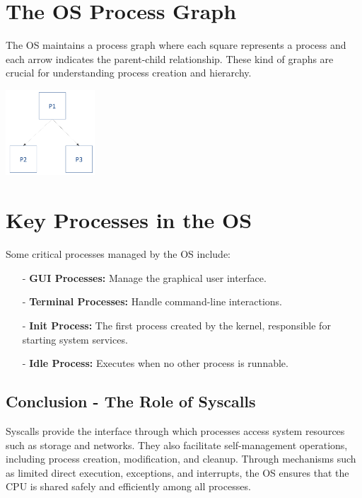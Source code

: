 \section{The OS Process Graph}
The OS maintains a process graph where each square represents a process and each arrow indicates the parent-child relationship. These kind of graphs are crucial for understanding process creation and hierarchy.

\begin{center}
  \includegraphics[width=0.25\textwidth]{chapters/L3/images/graph.png}
\end{center}

\section{Key Processes in the OS}

Some critical processes managed by the OS include:
\begin{itemize}
  \item[-] \textbf{GUI Processes:} Manage the graphical user interface.
  \item[-] \textbf{Terminal Processes:} Handle command-line interactions.
  \item[-] \textbf{Init Process:} The first process created by the kernel, responsible for starting system services.
  \item[-] \textbf{Idle Process:} Executes when no other process is runnable.
\end{itemize}

\subsection*{Conclusion - The Role of Syscalls}

Syscalls provide the interface through which processes access system resources such as storage and networks. They also facilitate self-management operations, including process creation, modification, and cleanup. Through mechanisms such as limited direct execution, exceptions, and interrupts, the OS ensures that the CPU is shared safely and efficiently among all processes.
